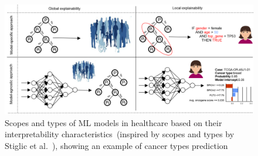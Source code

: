 \begin{figure}[h]
	\centering
	\includegraphics[scale=0.7]{images/lvg_cancer.png}	
    \caption{Scopes and types of ML models in healthcare based on their interpretability characteristics~(inspired by scopes and types by Stiglic et al.~\cite{stiglic2020interpretability}), showing an example of cancer types prediction}	
	\label{fig:local_vs_global_ex}
\end{figure}



